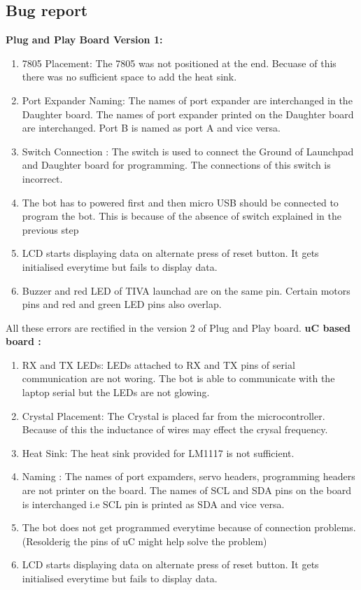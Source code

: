 \documentclass[a4paper,12pt,oneside]{book}
\begin{document}
	\subsection{Bug report}
		\textbf{Plug and Play Board Version 1:}
		\begin{enumerate}
			\item 7805 Placement: The 7805 was not positioned at the end. Becuase of this there was no sufficient space to add the heat sink. 
			\item Port Expander Naming: The names of port expander are interchanged in the Daughter board. The names of port expander printed on the Daughter board are interchanged. Port B is named as port A and vice versa. 
			\item Switch Connection : The switch is used to connect the Ground of Launchpad and Daughter board for programming. The connections of this switch is incorrect.
			\item The bot has to powered first and then micro USB should be connected to program the bot. This is because of the absence of switch explained in the previous step 
			\item LCD starts displaying data on alternate press of reset button. It gets initialised everytime but fails to display data.
			\item Buzzer and red LED of TIVA launchad are on the same pin. Certain motors pins and red and green LED pins also overlap.
		\end{enumerate}
	All these errors are rectified in the version 2 of Plug and Play board. 
		\textbf{uC based board :}
		\begin{enumerate}
			\item RX and TX LEDs: LEDs attached to RX and TX pins of serial communication are not woring. The bot is able to communicate with the laptop serial but the LEDs are not glowing.
			\item Crystal Placement: The Crystal is placed far from the microcontroller. Because of this the inductance of wires may effect the crysal frequency. 
			\item Heat Sink: The heat sink provided for LM1117 is not sufficient. 
			\item Naming : The names of port expamders, servo headers, programming headers are not printer on the board. The names of SCL and SDA pins on the board is interchanged i.e SCL pin is printed as SDA and vice versa.
			\item The bot does not get programmed everytime because of connection problems.(Resolderig the pins of uC might help solve the problem)
			\item LCD starts displaying data on alternate press of reset button. It gets initialised everytime but fails to display data.
		\end{enumerate}
\end{document}
